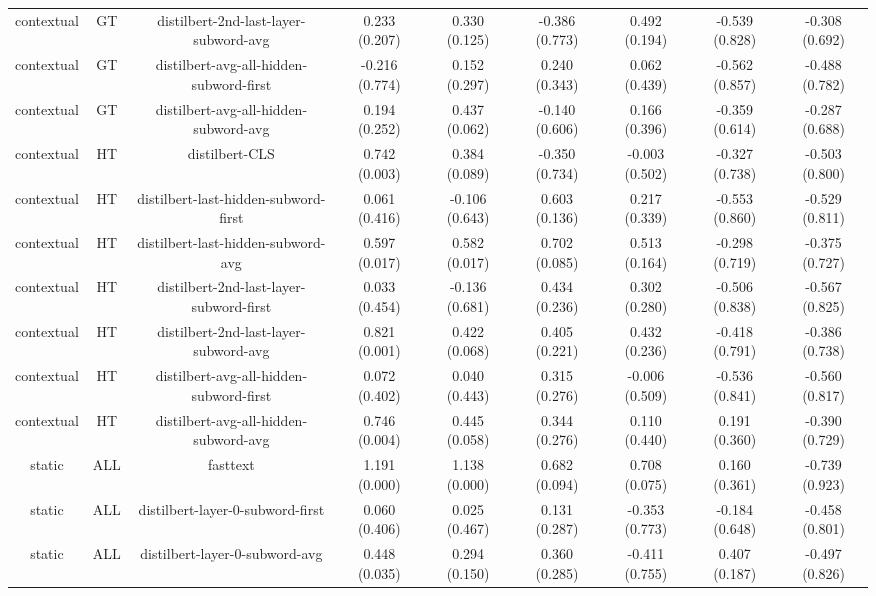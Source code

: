 \begin{sidewaystable}[htb]
\begin{tabular}{@{}ccccccccc@{}}
        contextual & GT & distilbert-2nd-last-layer-subword-avg & 0.233 (0.207) & 0.330 (0.125) & -0.386 (0.773) & 0.492 (0.194) & -0.539 (0.828) & -0.308 (0.692) \\
        contextual & GT & distilbert-avg-all-hidden-subword-first & -0.216 (0.774) & 0.152 (0.297) & 0.240 (0.343) & 0.062 (0.439) & -0.562 (0.857) & -0.488 (0.782) \\
        contextual & GT & distilbert-avg-all-hidden-subword-avg & 0.194 (0.252) & 0.437 (0.062) & -0.140 (0.606) & 0.166 (0.396) & -0.359 (0.614) & -0.287 (0.688) \\
        contextual & HT & distilbert-CLS & 0.742 (0.003) & 0.384 (0.089) & -0.350 (0.734) & -0.003 (0.502) & -0.327 (0.738) & -0.503 (0.800) \\
        contextual & HT & distilbert-last-hidden-subword-first & 0.061 (0.416) & -0.106 (0.643) & 0.603 (0.136) & 0.217 (0.339) & -0.553 (0.860) & -0.529 (0.811) \\
        contextual & HT & distilbert-last-hidden-subword-avg & 0.597 (0.017) & 0.582 (0.017) & 0.702 (0.085) & 0.513 (0.164) & -0.298 (0.719) & -0.375 (0.727) \\
        contextual & HT & distilbert-2nd-last-layer-subword-first & 0.033 (0.454) & -0.136 (0.681) & 0.434 (0.236) & 0.302 (0.280) & -0.506 (0.838) & -0.567 (0.825) \\
        contextual & HT & distilbert-2nd-last-layer-subword-avg & 0.821 (0.001) & 0.422 (0.068) & 0.405 (0.221) & 0.432 (0.236) & -0.418 (0.791) & -0.386 (0.738) \\
        contextual & HT & distilbert-avg-all-hidden-subword-first & 0.072 (0.402) & 0.040 (0.443) & 0.315 (0.276) & -0.006 (0.509) & -0.536 (0.841) & -0.560 (0.817) \\
        contextual & HT & distilbert-avg-all-hidden-subword-avg & 0.746 (0.004) & 0.445 (0.058) & 0.344 (0.276) & 0.110 (0.440) & 0.191 (0.360) & -0.390 (0.729) \\
        static & ALL & fasttext & 1.191 (0.000) & 1.138 (0.000) & 0.682 (0.094) & 0.708 (0.075) & 0.160 (0.361) & -0.739 (0.923) \\
        static & ALL & distilbert-layer-0-subword-first & 0.060 (0.406) & 0.025 (0.467) & 0.131 (0.287) & -0.353 (0.773) & -0.184 (0.648) & -0.458 (0.801) \\
        static & ALL & distilbert-layer-0-subword-avg & 0.448 (0.035) & 0.294 (0.150) & 0.360 (0.285) & -0.411 (0.755) & 0.407 (0.187) & -0.497 (0.826) \\

\end{tabular}
\end{sidewaystable}
